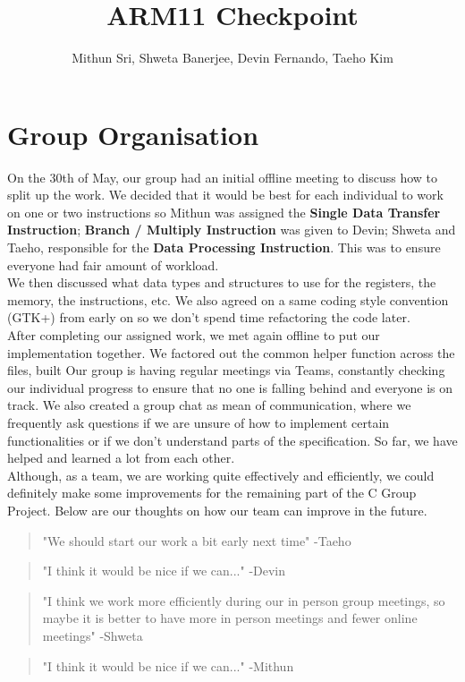 \documentclass[11pt]{article}
\begin{document}
\title{ARM11 Checkpoint}
\author{Mithun Sri, Shweta Banerjee, Devin Fernando, Taeho Kim}

\maketitle

\section{Group Organisation}


\-\hspace{1cm}On the 30th of May, our group had an initial offline meeting to discuss how to split up the work. We decided that it would be best for each individual to work on one or two instructions so Mithun was assigned the {\bf Single Data Transfer Instruction}; {\bf Branch / Multiply Instruction} was given to Devin; Shweta and Taeho, responsible for the {\bf Data Processing Instruction}. This was to ensure everyone had fair amount of workload. \\
\-\hspace{1cm}We then discussed what data types and structures to use for the registers, the memory, the instructions, etc. We also agreed on a same coding style convention (GTK+) from early on so we don't spend time refactoring the code later. \\
\-\hspace{1cm}After completing our assigned work, we met again offline to put our implementation together. We factored out the common helper function across the files, built 
\-\hspace{1cm}Our group is having regular meetings via Teams, constantly checking our individual progress to ensure that no one is falling behind and everyone is on track. We also created a group chat as mean of communication, where we frequently ask questions if we are unsure of how to implement certain functionalities or if we don't understand parts of the specification. So far, we have helped and learned a lot from each other.\\ 
\-\hspace{1cm}Although, as a team, we are working quite effectively and efficiently, we could definitely make some improvements for the remaining part of the C Group Project. Below are our thoughts on how our team can improve in the future.

\begin{quote}
  "We should start our work a bit early next time" -Taeho
\end{quote}
\begin{quote}
  "I think it would be nice if we can..." -Devin
\end{quote}
\begin{quote}
  "I think we work more efficiently during our in person group meetings, so maybe it is better to have more in person meetings and fewer online meetings" -Shweta
\end{quote}
\begin{quote}
  "I think it would be nice if we can..." -Mithun
\end{quote}
\end{document}

